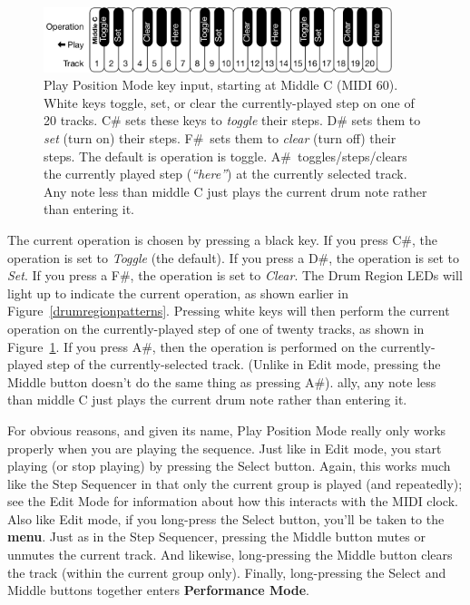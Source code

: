 \documentclass{article}
\begin{document}
\begin{figure}
\vspace{-1em}
\hspace{\fill}\includegraphics[width=4in]{PlayPositionModeKeys}
\vspace{-1em}
\caption{\small Play Position Mode key input, starting at Middle C (MIDI 60).  White keys toggle, set, or clear the currently-played step on one of 20 tracks.  C\# sets these keys to {\it toggle} their steps.  D\# sets them to {\it set} (turn on) their steps.  F\#~sets them to {\it clear} (turn off) their steps.  The default is operation is toggle.  A\#~toggles/steps/clears the currently played step ({\it ``here''}) at the currently selected track.  Any note less than middle C just plays the current drum note rather than entering it. }
\label{playpositionmodekeys}
\end{figure}

The current operation is chosen by  pressing a black key.  If you press C\#, the operation is set to {\it Toggle} (the default).  If you press a D\#, the operation is set to {\it Set}.  If you press a F\#, the operation is set to {\it Clear}.  The Drum Region LEDs will light up to indicate the current operation, as shown earlier in Figure~\ref{drumregionpatterns}.  Pressing white keys will then perform the current operation on the currently-played step of one of twenty tracks, as shown in Figure~\ref{playpositionmodekeys}.  If you press A\#, then the operation is performed on the currently-played step of the currently-selected track.  (Unlike in Edit mode, pressing the Middle button doesn't do the same thing as pressing A\#).  ally, any note less than middle C just plays the current drum note rather than entering it.

For obvious reasons, and given its name, Play Position Mode really only works properly when you are playing the sequence.  Just like in Edit mode, you start playing (or stop playing) by pressing the Select button.  Again, this works much like the Step Sequencer in that only the current group is played (and repeatedly); see the Edit Mode for information about how this interacts with the MIDI clock.   Also like Edit mode, if you long-press the Select button, you'll be taken to the {\bf menu}.    Just as in the Step Sequencer, pressing the Middle button mutes or unmutes the current track.    And likewise, long-pressing the Middle button clears the track (within the current group only).  Finally, long-pressing the Select and Middle buttons together enters {\bf Performance Mode}.
\end{document}
